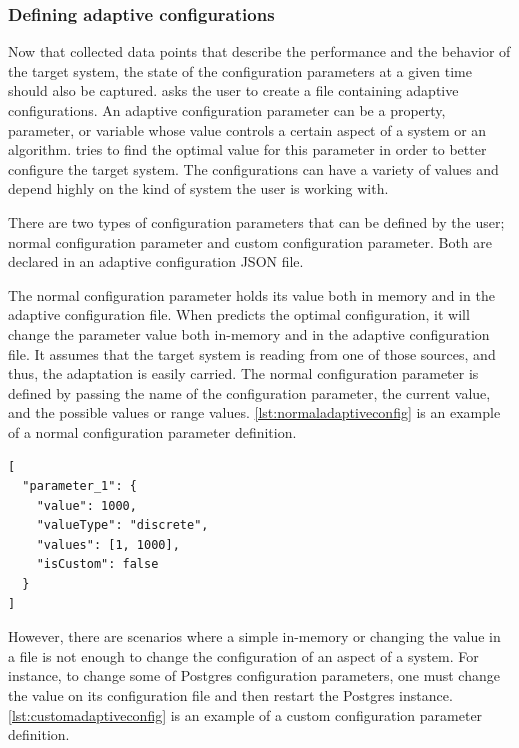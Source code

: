 \subsubsection{Defining adaptive configurations}

Now that \projectname{} collected data points that describe the performance and the behavior of the target system, the state of the configuration parameters at a given time should also be captured. \projectname{} asks the user to create a file containing adaptive configurations. An adaptive configuration parameter can be a property, parameter, or variable whose value controls a certain aspect of a system or an algorithm. \projectname{} tries to find the optimal value for this parameter in order to better configure the target system. The configurations can have a variety of values and depend highly on the kind of system the user is working with.

There are two types of configuration parameters that can be defined by the user; normal configuration parameter and custom configuration parameter. Both are declared in an adaptive configuration JSON file.

The normal configuration parameter holds its value both in memory and in the adaptive configuration file. When \projectname{} predicts the optimal configuration, it will change the parameter value both in-memory and in the adaptive configuration file. It assumes that the target system is reading from one of those sources, and thus, the adaptation is easily carried. The normal configuration parameter is defined by passing the name of the configuration parameter, the current value, and the possible values or range values. \ref{lst:normaladaptiveconfig} is an example of a normal configuration parameter definition.


\begin{lstlisting}[float,floatplacement=H,caption={Example of a normal adaptive configuration definition},label={lst:normaladaptiveconfig}]
[
  "parameter_1": {
    "value": 1000,
    "valueType": "discrete",
    "values": [1, 1000],
    "isCustom": false
  }
]
\end{lstlisting}

However, there are scenarios where a simple in-memory or changing the value in a file is not enough to change the configuration of an aspect of a system. For instance, to change some of Postgres configuration parameters, one must change the value on its configuration file and then restart the Postgres instance. \ref{lst:customadaptiveconfig} is an example of a custom configuration parameter definition.

